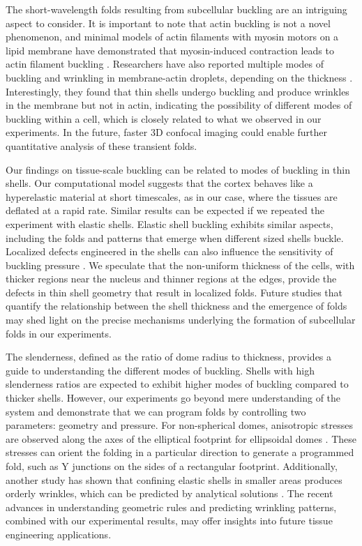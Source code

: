 The short-wavelength folds resulting from subcellular buckling are an intriguing aspect to consider. It is important to note that actin buckling is not a novel phenomenon, and minimal models of actin filaments with myosin motors on a lipid membrane have demonstrated that myosin-induced contraction leads to actin filament buckling \cite{murrell2012, costa2002,  wang2019}. Researchers have also reported multiple modes of buckling and wrinkling in membrane-actin droplets, depending on the thickness \cite{kusters2019}. Interestingly, they found that thin shells undergo buckling and produce wrinkles in the membrane but not in actin, indicating the possibility of different modes of buckling within a cell, which is closely related to what we observed in our experiments. In the future, faster 3D confocal imaging could enable further quantitative analysis of these transient folds.

Our findings on tissue-scale buckling can be related to modes of buckling in thin shells. Our computational model suggests that the cortex behaves like a hyperelastic material at short timescales, as in our case, where the tissues are deflated at a rapid rate. Similar results can be expected if we repeated the experiment with elastic shells. Elastic shell buckling exhibits similar aspects, including the folds and patterns that emerge when different sized shells buckle. Localized defects engineered in the shells can also influence the sensitivity of buckling pressure \cite{lee2016a}. We speculate that the non-uniform thickness of the cells, with thicker regions near the nucleus and thinner regions at the edges, provide the defects in thin shell geometry that result in localized folds. Future studies that quantify the relationship between the shell thickness and the emergence of folds may shed light on the precise mechanisms underlying the formation of subcellular folds in our experiments.

The slenderness, defined as the ratio of dome radius to thickness, provides a guide to understanding the different modes of buckling. Shells with high slenderness ratios are expected to exhibit higher modes of buckling compared to thicker shells. However, our experiments go beyond mere understanding of the system and demonstrate that we can program folds by controlling two parameters: geometry and pressure. For non-spherical domes, anisotropic stresses are observed along the axes of the elliptical footprint for ellipsoidal domes \cite{marin-llaurado2022}. These stresses can orient the folding in a particular direction to generate a programmed fold, such as Y junctions on the sides of a rectangular footprint. Additionally, another study has shown that confining elastic shells in smaller areas produces orderly wrinkles, which can be predicted by analytical solutions \cite{tobasco2022}. The recent advances in understanding geometric rules and predicting wrinkling patterns, combined with our experimental results, may offer insights into future tissue engineering applications.

